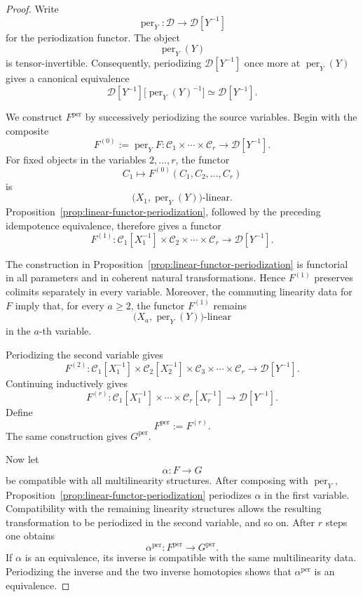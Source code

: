 \begin{proof}
Write
\[
    \operatorname{per}_Y:
    \mathcal D
    \longrightarrow
    \mathcal D[Y^{-1}]
\]
for the periodization functor.  The object
\[
    \operatorname{per}_Y(Y)
\]
is tensor-invertible.  Consequently, periodizing
\(\mathcal D[Y^{-1}]\) once more at
\(\operatorname{per}_Y(Y)\) gives a canonical equivalence
\[
    \mathcal D[Y^{-1}]
    \bigl[
      \operatorname{per}_Y(Y)^{-1}
    \bigr]
    \simeq
    \mathcal D[Y^{-1}].
\]

We construct \(F^{\mathrm{per}}\) by successively periodizing the source
variables.  Begin with the composite
\[
    F^{(0)}
    :=
    \operatorname{per}_Y F:
    \mathcal C_1\times\cdots\times\mathcal C_r
    \longrightarrow
    \mathcal D[Y^{-1}].
\]
For fixed objects in the variables \(2,\ldots,r\), the functor
\[
    C_1
    \longmapsto
    F^{(0)}(C_1,C_2,\ldots,C_r)
\]
is
\[
    \bigl(
      X_1,\operatorname{per}_Y(Y)
    \bigr)\text{-linear}.
\]
Proposition~\ref{prop:linear-functor-periodization}, followed by the preceding
idempotence equivalence, therefore gives a functor
\[
    F^{(1)}:
    \mathcal C_1[X_1^{-1}]
    \times
    \mathcal C_2
    \times\cdots\times
    \mathcal C_r
    \longrightarrow
    \mathcal D[Y^{-1}].
\]

The construction in
Proposition~\ref{prop:linear-functor-periodization} is functorial in all
parameters and in coherent natural transformations.  Hence \(F^{(1)}\)
preserves colimits separately in every variable.  Moreover, the commuting
linearity data for \(F\) imply that, for every \(a\geq2\), the functor
\(F^{(1)}\) remains
\[
    \bigl(
      X_a,\operatorname{per}_Y(Y)
    \bigr)\text{-linear}
\]
in the \(a\)-th variable.

Periodizing the second variable gives
\[
    F^{(2)}:
    \mathcal C_1[X_1^{-1}]
    \times
    \mathcal C_2[X_2^{-1}]
    \times
    \mathcal C_3
    \times\cdots\times
    \mathcal C_r
    \longrightarrow
    \mathcal D[Y^{-1}].
\]
Continuing inductively gives
\[
    F^{(r)}:
    \mathcal C_1[X_1^{-1}]
    \times\cdots\times
    \mathcal C_r[X_r^{-1}]
    \longrightarrow
    \mathcal D[Y^{-1}].
\]
Define
\[
    F^{\mathrm{per}}
    :=
    F^{(r)}.
\]
The same construction gives \(G^{\mathrm{per}}\).

Now let
\[
    \alpha:F\longrightarrow G
\]
be compatible with all multilinearity structures.  After composing with
\(\operatorname{per}_Y\), Proposition~\ref{prop:linear-functor-periodization}
periodizes \(\alpha\) in the first variable.  Compatibility with the remaining
linearity structures allows the resulting transformation to be periodized in
the second variable, and so on.  After \(r\) steps one obtains
\[
    \alpha^{\mathrm{per}}:
    F^{\mathrm{per}}
    \longrightarrow
    G^{\mathrm{per}}.
\]
If \(\alpha\) is an equivalence, its inverse is compatible with the same
multilinearity data.  Periodizing the inverse and the two inverse homotopies
shows that \(\alpha^{\mathrm{per}}\) is an equivalence.


\end{proof}
